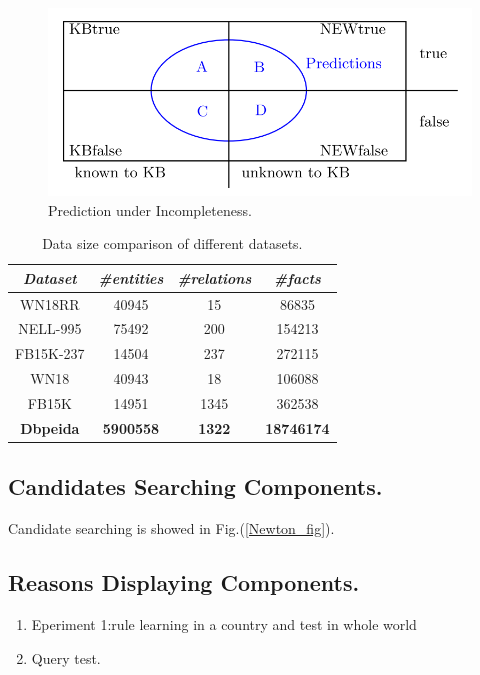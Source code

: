 \documentclass[runningheads]{llncs}
\begin{document}
\begin{figure}
\includegraphics[width=\textwidth]{pui.png}
\caption{Prediction under Incompleteness.} \label{PCA}
\end{figure}

\begin{table}
\caption{Data size comparison of different datasets.}\label{datasetCom}
\centering
\begin{tabular}{|c|c|c|c|}
\hline
\textit{Dataset} & \textit{\#entities} & \textit{\#relations} & \textit{\#facts}\\
\hline
WN18RR & 40945 & 15 & 86835 \\
NELL-995 & 75492 & 200 & 154213 \\
FB15K-237 & 14504 & 237 & 272115 \\
WN18 & 40943 & 18 & 106088 \\
FB15K & 14951 & 1345 & 362538 \\
\hline
\textbf{Dbpeida} & \textbf{5900558} & \textbf{1322} & \textbf{18746174} \\
\hline
\end{tabular}
\end{table}

\subsection{Candidates Searching Components.}
Candidate searching is showed in Fig.(\ref{Newton_fig}).
\subsection{Reasons Displaying Components.}

\begin{enumerate}
  \item Eperiment 1:rule learning in a country and test in whole world
  \item Query test.
\end{enumerate}
\end{document}
